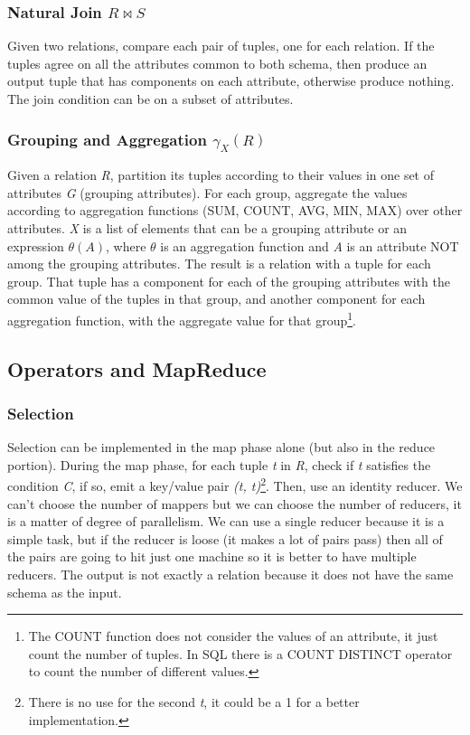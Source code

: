		\subsubsection{Natural Join $R \bowtie S$}
			\par
			Given two relations, compare each pair of tuples, one for each relation. If the tuples agree on all the attributes common to both schema, then produce an output tuple that has components on each attribute, otherwise produce nothing.
			\newline
			The join condition can be on a subset of attributes.
		\subsubsection{Grouping and Aggregation $\gamma_X(R)$}
			\par
			Given a relation \textit{R}, partition its tuples according to their values in one set of attributes \textit{G} (grouping attributes). For each group, aggregate the values according to aggregation functions (SUM, COUNT, AVG, MIN, MAX) over other attributes.
			\newline
			\textit{X} is a list of elements that can be a grouping attribute or an expression $\theta(A)$, where $\theta$ is an aggregation function and \textit{A} is an attribute NOT among the grouping attributes.
			\newline
			The result is a relation with a tuple for each group. That tuple has a component for each of the grouping attributes with the common value of the tuples in that group, and another component for each aggregation function, with the aggregate value for that group\footnote{The COUNT function does not consider the values of an attribute, it just count the number of tuples. In SQL there is a COUNT DISTINCT operator to count the number of different values.}.
			
	\subsection{Operators and MapReduce}
		\subsubsection{Selection}
			\par
			Selection can be implemented in the map phase alone (but also in the reduce portion).
			\newline
			During the map phase, for each tuple \textit{t} in \textit{R}, check if \textit{t} satisfies the condition \textit{C}, if so, emit a key/value pair \textit{(t, t)}\footnote{There is no use for the second \textit{t}, it could be a 1 for a better implementation.}.
			\newline
			Then, use an identity reducer. We can't choose the number of mappers but we can choose the number of reducers, it is a matter of degree of parallelism. We can use a single reducer because it is a simple task, but if the reducer is loose (it makes a lot of pairs pass) then all of the pairs are going to hit just one machine so it is better to have multiple reducers.
			\newline
			The output is not exactly a relation because it does not have the same schema as the input.
